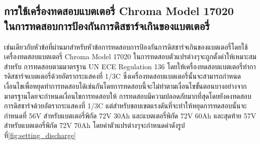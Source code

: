 \subsection{การใช้เครื่องทดสอบแบตเตอรี่ Chroma Model 17020 \\ ในการทดสอบการป้องกันการดิสชาร์จเกินของแบตเตอรี่}
เช่นเดียวกับหัวข้อที่ผ่านมาสำหรับหัวข้อการทดสอบการป้องกันการดิสชาร์จเกินของแบตเตอรี่โดยใช้เครื่องทดสอบแบตเตอรี่ Chroma Model 17020 ในการทดสอบตัวแปรต่างๆจะถูกตั้งค่าให้เหมาะสมสำหรับ
การทดสอบตามมาตรฐาน UN ECE Regulation 136 โดยให้เครื่องทดสอบแบตเตอรี่ทำการดิสชาร์จแบตเตอรี่ด้วยอัตรากระแสคงที่ 1/3C ซึ่งเครื่องทดสอบแบตเตอรี่นั้นจะสามารถกำหนดเงื่อนไขเพื่อหยุดทำการทดสอบได้เช่นกันโดยการทดสอบนี้จะไม่ทำตามเงื่อนไขขั้นตอนบางอย่างจากมาตรฐานโดยจะกำหนดเงื่อนไขการทดสอบให้
การทดสอบมีความปลอดภัยมากที่สุดโดยยังคงทดสอบการดิสชาร์จด้วยอัตรากระแสคงที่ 1/3C แต่สำหรับขอบเขตแรงดันที่จะทำให้หยุดการทดสอบนั้นจะกำหนดที่ 
56V สำหรับแบตเตอรี่พิกัด 72V 30Ah และแบตเตอรี่พิกัด 72V 60Ah และสุดท้าย 57V สำหรับแบตเตอรี่พิกัด 72V 70Ah โดยค่าตัวแปรต่างๆจะกำหนดค่าดังรูป
ที่\ref{fig:setting_discharge}
